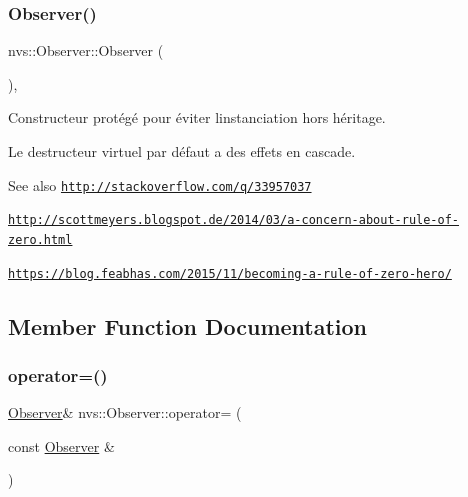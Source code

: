 \subsubsection{\texorpdfstring{Observer()}{Observer()}\hspace{0.1cm}{\footnotesize\ttfamily [3/3]}}
{\footnotesize\ttfamily nvs\+::\+Observer\+::\+Observer (\begin{DoxyParamCaption}{ }\end{DoxyParamCaption})\hspace{0.3cm}{\ttfamily [protected]}, {\ttfamily [default]}}



Constructeur protégé pour éviter l\textquotesingle{}instanciation hors héritage. 

Le destructeur virtuel par défaut a des effets en cascade.

\begin{DoxySeeAlso}{See also}
\href{http://stackoverflow.com/q/33957037}{\tt http\+://stackoverflow.\+com/q/33957037} 

\href{http://scottmeyers.blogspot.de/2014/03/a-concern-about-rule-of-zero.html}{\tt http\+://scottmeyers.\+blogspot.\+de/2014/03/a-\/concern-\/about-\/rule-\/of-\/zero.\+html} 

\href{https://blog.feabhas.com/2015/11/becoming-a-rule-of-zero-hero/}{\tt https\+://blog.\+feabhas.\+com/2015/11/becoming-\/a-\/rule-\/of-\/zero-\/hero/} 
\end{DoxySeeAlso}


\subsection{Member Function Documentation}
\mbox{\label{classnvs_1_1_observer_a405218b4689360fb9d8fdab3bed37dad}} 
\subsubsection{\texorpdfstring{operator=()}{operator=()}\hspace{0.1cm}{\footnotesize\ttfamily [1/2]}}
{\footnotesize\ttfamily \mbox{\hyperlink{classnvs_1_1_observer}{Observer}}\& nvs\+::\+Observer\+::operator= (\begin{DoxyParamCaption}\item[{const \mbox{\hyperlink{classnvs_1_1_observer}{Observer}} \&}]{ }\end{DoxyParamCaption})\hspace{0.3cm}{\ttfamily [default]}}




